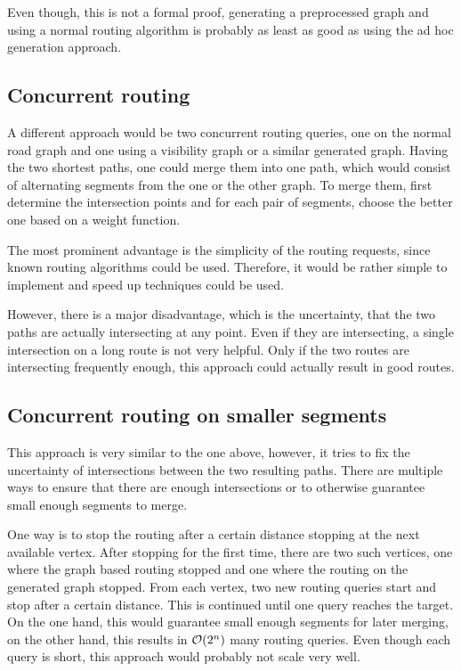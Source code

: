 		Even though, this is not a formal proof, generating a preprocessed graph and using a normal routing algorithm is probably as least as good as using the ad hoc generation approach.
	
	\subsection{Concurrent routing}
	
		A different approach would be two concurrent routing queries, one on the normal road graph and one using a visibility graph or a similar generated graph.
		Having the two shortest paths, one could merge them into one path, which would consist of alternating segments from the one or the other graph.
		To merge them, first determine the intersection points and for each pair of segments, choose the better one based on a weight function.
		
		The most prominent advantage is the simplicity of the routing requests, since known routing algorithms could be used.
		Therefore, it would be rather simple to implement and speed up techniques could be used.
		
		However, there is a major disadvantage, which is the uncertainty, that the two paths are actually intersecting at any point.
		Even if they are intersecting, a single intersection on a long route is not very helpful.
		Only if the two routes are intersecting frequently enough, this approach could actually result in good routes.
	
	\subsection{Concurrent routing on smaller segments}
	
		This approach is very similar to the one above, however, it tries to fix the uncertainty of intersections between the two resulting paths.
		There are multiple ways to ensure that there are enough intersections or to otherwise guarantee small enough segments to merge.
		
		One way is to stop the routing after a certain distance stopping at the next available vertex.
		After stopping for the first time, there are two such vertices, one where the graph based routing stopped and one where the routing on the generated graph stopped.
		From each vertex, two new routing queries start and stop after a certain distance.
		This is continued until one query reaches the target.
		On the one hand, this would guarantee small enough segments for later merging, on the other hand, this results in $\mathcal{O}(2^n)$ many routing queries.
		Even though each query is short, this approach would probably not scale very well.
		
